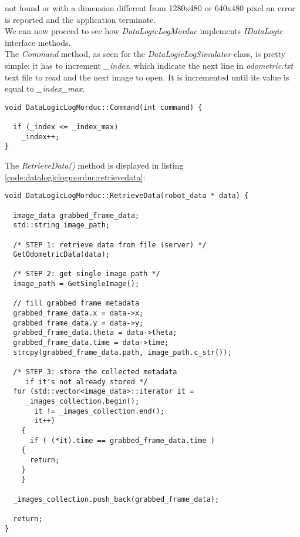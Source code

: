 not found or with a dimension different from 1280x480 or
640x480 pixel an error is reported and the application terminate.
\\
We can now proceed to see how \textit{DataLogicLogMorduc} implements
\textit{IDataLogic} interface methods.
\\
The \textit{Command} method, as seen for the \textit{DataLogicLogSimulator}
class, is pretty simple: it has to increment \textit{\_index},
which indicate the next line in \textit{odometric.txt}
text file to read and the next image to open. It is incremented until
its value is equal to \textit{\_index\_max}.
\\
\begin{lstlisting}[caption={\texttt{DataLogicLogMorduc::Command() method}},
    label={code:datalogiclogmorduc:command}]
void DataLogicLogMorduc::Command(int command) {

  if (_index <= _index_max)
    _index++;
}
\end{lstlisting}

The \textit{RetrieveData()} method is displayed in listing
\ref{code:datalogiclogmorduc:retrievedata}:
\\
\begin{lstlisting}[caption={\texttt{DataLogicLogSimulator::RetrieveData()} method},
    label={code:datalogiclogmorduc:retrievedata}]
void DataLogicLogMorduc::RetrieveData(robot_data * data) {

  image_data grabbed_frame_data;
  std::string image_path;

  /* STEP 1: retrieve data from file (server) */
  GetOdometricData(data);

  /* STEP 2: get single image path */
  image_path = GetSingleImage();
   
  // fill grabbed frame metadata
  grabbed_frame_data.x = data->x;
  grabbed_frame_data.y = data->y;
  grabbed_frame_data.theta = data->theta;
  grabbed_frame_data.time = data->time;
  strcpy(grabbed_frame_data.path, image_path.c_str());

  /* STEP 3: store the collected metadata
     if it's not already stored */
  for (std::vector<image_data>::iterator it =
	 _images_collection.begin();
       it != _images_collection.end();
       it++)
    {
      if ( (*it).time == grabbed_frame_data.time )
	{
	  return;
	}
    }

  _images_collection.push_back(grabbed_frame_data);
  
  return;
}
\end{lstlisting}

